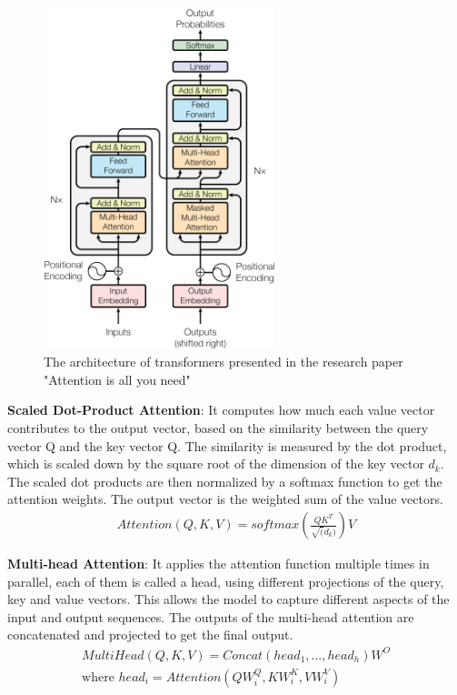 \begin{figure}[hbt]
    \centering
    
    \includegraphics[width=0.6\textwidth]{theoretical-background/image/transformer.png}
    \caption{The architecture of transformers presented in the research paper "Attention is all you need" \cite{NIPS2017_3f5ee243}}
    \label{fig:transformer}
\end{figure}
\textbf{Scaled Dot-Product Attention}: It computes how much each value vector contributes to the output vector, based on the similarity between the query vector Q and the key vector Q. The similarity is measured by the dot product, which is scaled down by the square root of the dimension of the key vector $d_k$. The scaled dot products are then normalized by a softmax function to get the attention weights. The output vector is the weighted sum of the value vectors.
\begin{align}
    Attention (Q,K,V)=softmax(\frac{QK^T}{\sqrt(d_k)})V
\end{align}

\textbf{Multi-head Attention}: It applies the attention function multiple times in parallel, each of them is called a head, using different projections of the query, key and value vectors. This allows the model to capture different aspects of the input and output sequences. The outputs of the multi-head attention are concatenated and projected to get the final output.
\begin{align}
    MultiHead(Q,K,V)= Concat(head_1,...,head_h)W^O\\
    \text{where } head_i=Attention(QW_{i}^Q, KW_{i}^K, VW_{i}^V)
\end{align}

